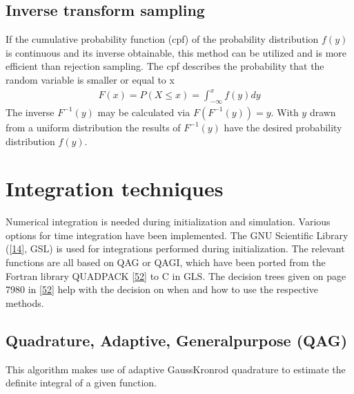 \documentclass[letterpaper,10pt,english]{sphinxmanual}
\begin{document}
				\subsection{Inverse transform sampling}
					\label{\detokenize{NBodySimulation/Initialization:inverse-transform-sampling}}
					\sphinxAtStartPar
					If the cumulative probability function (cpf) of the probability distribution \(f(y)\) is continuous and its inverse obtainable, this method can be utilized and is more efficient than rejection sampling.
					The cpf describes the probability that the random variable is smaller or equal to x
					\begin{equation*}
					\begin{split}F(x)=P(X \leq x) = \int_{-\infty }^{x}f(y) dy\end{split}
					\end{equation*}
					\sphinxAtStartPar
					The inverse \(F^{-1}(y)\) may be calculated via \(F(F^{-1}(y)) = y\). With \(y\) drawn from a uniform distribution the results of \(F^{-1}(y)\) have the desired probability distribution \(f(y)\).

		\section{Integration techniques}
			\label{\detokenize{NBodySimulation/Integration:integration}}\label{\detokenize{NBodySimulation/Integration::doc}}
			\sphinxAtStartPar
			Numerical integration is needed during initialization and simulation.
			Various options for time integration have been implemented.
			The GNU Scientific Library ({[}\hyperlink{cite.NBodySimulation/Appendix:id24}{14}{]}, GSL) is used for integrations performed during initialization.
			The relevant functions are all based on QAG or QAGI, which have been ported from the Fortran library QUADPACK {[}\hyperlink{cite.NBodySimulation/Appendix:id25}{52}{]} to C in GLS.
			The decision trees given on page 79\sphinxhyphen{}80 in {[}\hyperlink{cite.NBodySimulation/Appendix:id25}{52}{]} help with the decision on when and how to use the respective methods.
			
			
			\subsection{Quadrature, Adaptive, General\sphinxhyphen{}purpose (QAG)}
				\label{\detokenize{NBodySimulation/Integration:quadrature-adaptive-general-purpose-qag}}
				\sphinxAtStartPar
				This algorithm makes use of adaptive Gauss\sphinxhyphen{}Kronrod quadrature to estimate the definite integral of a given function.
				
\end{document}
